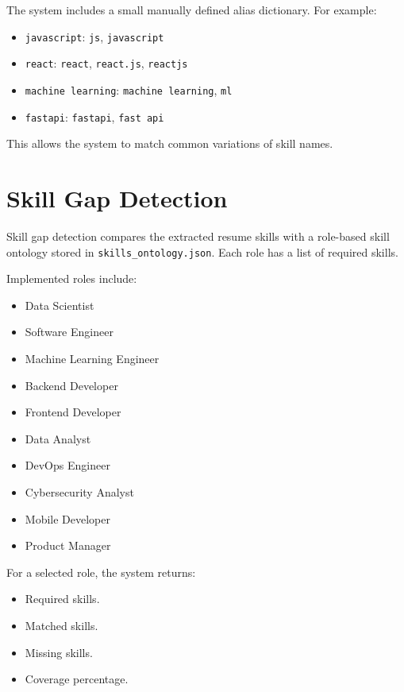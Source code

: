 \documentclass[12pt,a4paper]{article}
\begin{document}
The system includes a small manually defined alias dictionary. For example:

\begin{itemize}
    \item \texttt{javascript}: \texttt{js}, \texttt{javascript}
    \item \texttt{react}: \texttt{react}, \texttt{react.js}, \texttt{reactjs}
    \item \texttt{machine learning}: \texttt{machine learning}, \texttt{ml}
    \item \texttt{fastapi}: \texttt{fastapi}, \texttt{fast api}
\end{itemize}

This allows the system to match common variations of skill names.

\section{Skill Gap Detection}

Skill gap detection compares the extracted resume skills with a role-based skill ontology stored in \texttt{skills\_ontology.json}. Each role has a list of required skills.

Implemented roles include:

\begin{itemize}
    \item Data Scientist
    \item Software Engineer
    \item Machine Learning Engineer
    \item Backend Developer
    \item Frontend Developer
    \item Data Analyst
    \item DevOps Engineer
    \item Cybersecurity Analyst
    \item Mobile Developer
    \item Product Manager
\end{itemize}

For a selected role, the system returns:

\begin{itemize}
    \item Required skills.
    \item Matched skills.
    \item Missing skills.
    \item Coverage percentage.
\end{itemize}
\end{document}
